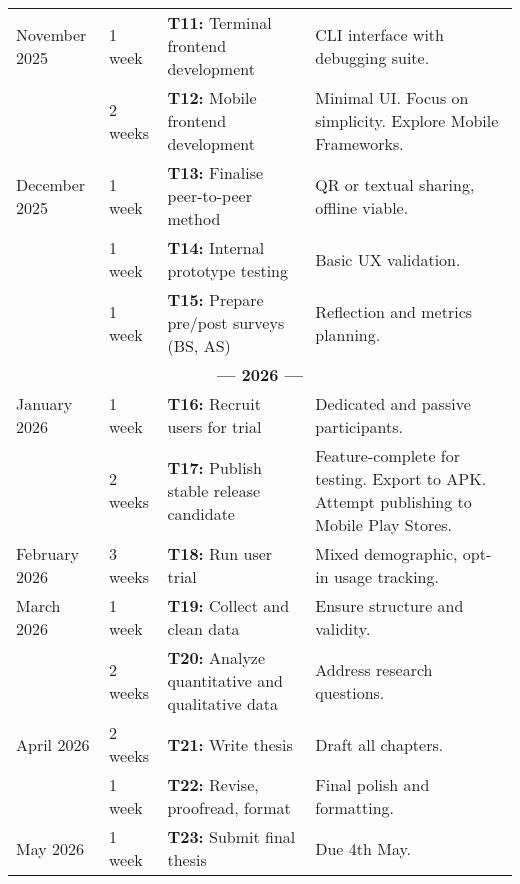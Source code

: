 \documentclass{imc-inf}
\begin{document}
\begin{longtable}{|l|l|p{7.5cm}|p{4cm}|}
\hline
November 2025 & 1 week   & \textbf{T11:} Terminal frontend development & CLI
                                                                         interface
                                                                         with
                                                                         debugging
                                                                         suite. \\
              & 2 weeks  & \textbf{T12:} Mobile frontend development & Minimal
                                                                       UI. Focus
                                                                       on
                                                                       simplicity.
                                                                       Explore
                                                                       Mobile Frameworks. \\
\hline
December 2025 & 1 week   & \textbf{T13:} Finalise peer-to-peer method & QR or textual sharing, offline viable. \\
              & 1 week   & \textbf{T14:} Internal prototype testing & Basic UX validation. \\
              & 1 week   & \textbf{T15:} Prepare pre/post surveys (BS, AS) & Reflection and metrics planning. \\
\hline
\multicolumn{4}{|c|}{\textbf{--- 2026 ---}} \\
\hline
January 2026  & 1 week   & \textbf{T16:} Recruit users for trial & Dedicated and passive participants. \\
              & 2 weeks  & \textbf{T17:} Publish stable release candidate &
                                                                            Feature-complete
                                                                            for
                                                                            testing.
                                                                            Export
                                                                            to
                                                                            APK.
  Attempt publishing to Mobile Play Stores. \\
\hline
February 2026 & 3 weeks  & \textbf{T18:} Run user trial & Mixed demographic, opt-in usage tracking. \\
\hline
March 2026    & 1 week   & \textbf{T19:} Collect and clean data & Ensure structure and validity. \\
              & 2 weeks  & \textbf{T20:} Analyze quantitative and qualitative data & Address research questions. \\
\hline
April 2026    & 2 weeks  & \textbf{T21:} Write thesis & Draft all chapters. \\
              & 1 week   & \textbf{T22:} Revise, proofread, format & Final polish and formatting. \\
\hline
May 2026      & 1 week   & \textbf{T23:} Submit final thesis & Due 4th May. \\
\hline
\end{longtable}
\end{document}
